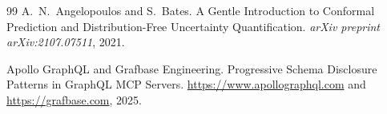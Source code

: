 \documentclass[10pt,twocolumn]{article}
\begin{document}
\begin{thebibliography}{99}
A.~N.~Angelopoulos and S.~Bates.
\newblock A Gentle Introduction to Conformal Prediction and Distribution-Free Uncertainty Quantification.
\newblock \emph{arXiv preprint arXiv:2107.07511}, 2021.

{Apollo GraphQL and Grafbase Engineering}.
\newblock Progressive Schema Disclosure Patterns in GraphQL MCP Servers.
\newblock \url{https://www.apollographql.com} and \url{https://grafbase.com}, 2025.

\end{thebibliography}
\end{document}
